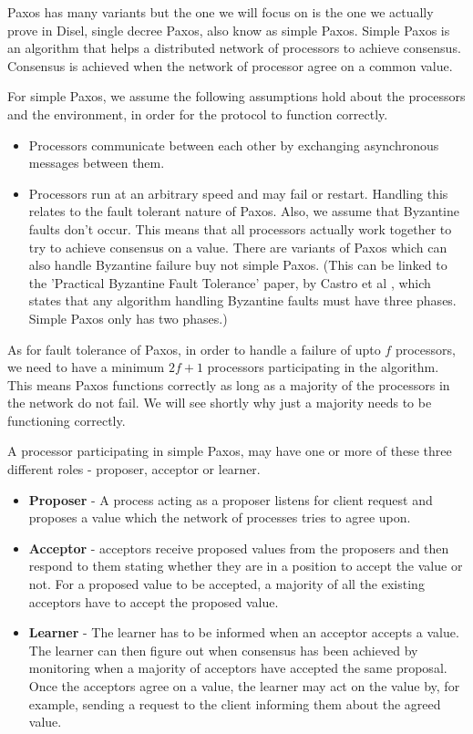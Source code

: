 Paxos has many variants but the one we will focus on is the one we actually prove
in Disel, single decree Paxos, also know as simple Paxos. Simple Paxos is an algorithm
that helps a distributed network of processors to achieve consensus.
Consensus is achieved when the network of processor agree on a common value.

For simple Paxos, we assume the following assumptions hold about the processors
and the environment, in order for the protocol to function correctly.
\begin{itemize}
  \item Processors communicate between each other by exchanging asynchronous messages between them.
  \item Processors run at an arbitrary speed and may fail or restart. Handling this relates
    to the fault tolerant nature of Paxos. Also, we assume that Byzantine faults don't occur.
    This means that all processors actually work together to try to achieve consensus on a value.
    There are variants of Paxos which can also handle Byzantine failure buy not simple Paxos.
    (This can be linked to the 'Practical Byzantine Fault Tolerance' paper, by Castro et al \cite{2},
    which states that any algorithm handling
    Byzantine faults must have three phases. Simple Paxos only has two phases.)
\end{itemize}

As for fault tolerance of Paxos, in order to handle a failure of upto $f$ processors,
we need to have a minimum $2f + 1$ processors participating in the algorithm. This
means Paxos functions correctly as long as a majority of the processors in the
network do not fail. We will see shortly why just a majority needs to be functioning
correctly.

A processor participating in simple Paxos, may have one or more of these three
different roles - proposer, acceptor or learner.
\begin{itemize}
  \item \textbf{Proposer} - A process acting as a proposer listens for client
    request and proposes a value which the network of processes tries to agree upon.
  \item \textbf{Acceptor} - acceptors receive proposed values from the proposers
    and then respond to them stating whether they are in a position to accept the value or not.
    For a proposed value to be accepted, a majority of all the existing acceptors
    have to accept the proposed value.
  \item \textbf{Learner} - The learner has to be informed when an acceptor accepts a value.
    The learner can then figure out when consensus has been achieved by monitoring
    when a majority of acceptors have accepted the same proposal.
    Once the acceptors agree on a value, the learner may act on the value by,
    for example, sending a request to the client informing them about the agreed value.
\end{itemize}

